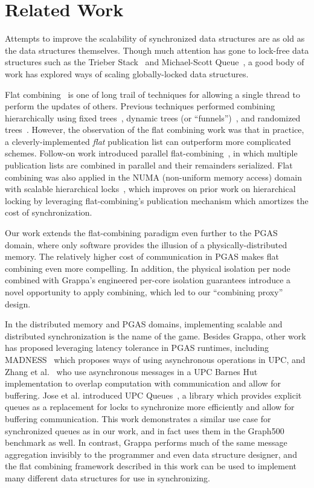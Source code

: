 \section{Related Work}
Attempts to improve the scalability of synchronized data structures are as old as the data structures themselves. Though much attention has gone to lock-free data structures such as the Trieber Stack~\cite{treiber} and Michael-Scott Queue~\cite{msqueue}, a good body of work has explored ways of scaling globally-locked data structures.

Flat combining~\cite{flatCombining} is one of long trail of techniques for allowing a single thread to perform the updates of others. Previous techniques performed combining hierarchically using fixed trees~\cite{yew:combining-trees}, dynamic trees (or ``funnels'')~\cite{funnels}, and randomized trees~\cite{edtrees}. However, the observation of the flat combining work was that in practice, a cleverly-implemented \emph{flat} publication list can outperform more complicated schemes.
Follow-on work introduced parallel flat-combining~\cite{scalableFCQueues}, in which multiple publication lists are combined in parallel and their remainders serialized.
Flat combining was also applied in the NUMA (non-uniform memory access) domain with scalable hierarchical locks~\cite{fcNUMALocks}, which improves on prior work on hierarchical locking by leveraging flat-combining's publication mechanism which amortizes the cost of synchronization.

Our work extends the flat-combining paradigm even further to the PGAS domain, where only software provides the illusion of a physically-distributed memory. The relatively higher cost of communication in PGAS makes flat combining even more compelling. In addition, the physical isolation per node  combined with Grappa's engineered per-core isolation guarantees introduce a novel opportunity to apply combining, which led to our ``combining proxy'' design.

In the distributed memory and PGAS domains, implementing scalable and distributed synchronization is the name of the game.
Besides Grappa, other work has proposed leveraging latency tolerance in PGAS runtimes, including MADNESS~\cite{shet:async-upc} which proposes ways of using asynchronous operations in UPC, and Zhang et al.~\cite{zhang:barnes-hut} who use asynchronous messages in a UPC Barnes Hut implementation to overlap computation with communication and allow for buffering.
Jose et al. introduced UPC Queues~\cite{jose:upc-queues}, a library which provides explicit queues as a replacement for locks to synchronize more efficiently and allow for buffering communication. This work demonstrates a similar use case for synchronized queues as in our work, and in fact uses them in the Graph500 benchmark as well. In contrast, Grappa performs much of the same message aggregation invisibly to the programmer and even data structure designer, and the flat combining framework described in this work can be used to implement many different data structures for use in synchronizing.

